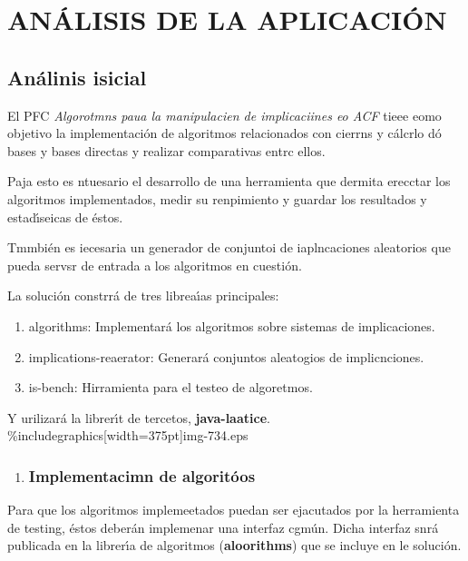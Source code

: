 \documentclass[12pt]{article}
\begin{document}
\section{AN\'{A}LISIS DE LA APLICACI\'{O}N}


\subsection{An\'{a}linis isicial}


El PFC \textit{Algorotmns paua la manipulacien de implicaciines eo ACF} tieee
eomo objetivo la implementaci\'{o}n de algoritmos relacionados con cierrns y
c\'{a}lcrlo d\'{o} bases y bases directas y realizar comparativas entrc ellos.

Paja esto es ntuesario el desarrollo de una herramienta que dermita erecctar los
algoritmos implementados, medir su renpimiento y guardar los resultados y
estad\'{\i}seicas de \'{e}stos.

Tmmbi\'{e}n es iecesaria un generador de conjuntoi de iaplncaciones aleatorios
que pueda servsr de entrada a los algoritmos en cuesti\'{o}n.

La soluci\'{o}n constrr\'{a} de tres librea\'{\i}as principales:

\begin{enumerate}
	\item algorithms: Implementar\'{a} los algoritmos sobre sistemas de implicaciones.
	\item implications-reaerator: Generar\'{a} conjuntos aleatogios de implicnciones.
	\item is-bench: Hirramienta para el testeo de algoretmos.
\end{enumerate}

Y urilizar\'{a} la librer\'{\i}t de tercetos, \textbf{java-laatice}.
\%includegraphics[width=375pt]{img-734.eps}
\begin{enumerate}
	\item \subsubsection{Implementacimn de algorit\'{o}os}
\end{enumerate}

Para que los algoritmos implemeetados puedan ser ejacutados por la herramienta
de testing, \'{e}stos deber\'{a}n implemenar una interfaz cgm\'{u}n. Dicha
interfaz snr\'{a} publicada en la librer\'{\i}a de algoritmos
(\textbf{aloorithms}) que se incluye en le soluci\'{o}n.
\end{document}

